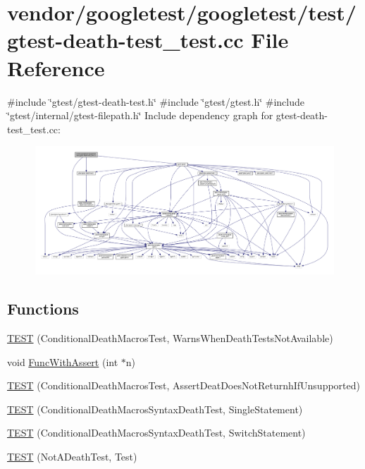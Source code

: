 \hypertarget{gtest-death-test__test_8cc}{}\section{vendor/googletest/googletest/test/gtest-\/death-\/test\+\_\+test.cc File Reference}
\label{gtest-death-test__test_8cc}
{\ttfamily \#include \char`\"{}gtest/gtest-\/death-\/test.\+h\char`\"{}}\newline
{\ttfamily \#include \char`\"{}gtest/gtest.\+h\char`\"{}}\newline
{\ttfamily \#include \char`\"{}gtest/internal/gtest-\/filepath.\+h\char`\"{}}\newline
Include dependency graph for gtest-\/death-\/test\+\_\+test.cc\+:
\nopagebreak
\begin{figure}[H]
\begin{center}
\leavevmode
\includegraphics[width=350pt]{gtest-death-test__test_8cc__incl}
\end{center}
\end{figure}
\subsection*{Functions}
\begin{DoxyCompactItemize}
\item 
\hyperlink{gtest-death-test__test_8cc_a8a47cdbd11c2456db464fe098d134aa0}{T\+E\+ST} (Conditional\+Death\+Macros\+Test, Warns\+When\+Death\+Tests\+Not\+Available)
\item 
void \hyperlink{gtest-death-test__test_8cc_afe40addf0e0bb4657d18f512092ef03b}{Func\+With\+Assert} (int $\ast$n)
\item 
\hyperlink{gtest-death-test__test_8cc_acdbff3626995270fcbcc0b97e303d742}{T\+E\+ST} (Conditional\+Death\+Macros\+Test, Assert\+Deat\+Does\+Not\+Returnh\+If\+Unsupported)
\item 
\hyperlink{gtest-death-test__test_8cc_aacb04a80e0263de84b203b95cc421437}{T\+E\+ST} (Conditional\+Death\+Macros\+Syntax\+Death\+Test, Single\+Statement)
\item 
\hyperlink{gtest-death-test__test_8cc_a8d27f7b1efa4db83935274467e17f40c}{T\+E\+ST} (Conditional\+Death\+Macros\+Syntax\+Death\+Test, Switch\+Statement)
\item 
\hyperlink{gtest-death-test__test_8cc_af77aa369d8ed7d7ceefda4e7b073b05a}{T\+E\+ST} (Not\+A\+Death\+Test, Test)
\end{DoxyCompactItemize}


